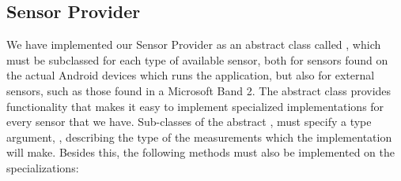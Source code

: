 \subsection{Sensor Provider}
\label{sub:providing_sensor_data_implementation}
We have implemented our Sensor Provider as an abstract class called , which must be subclassed for each type of available sensor, both for sensors found on the actual Android devices which runs the application, but also for external sensors, such as those found in a Microsoft Band 2. The abstract class provides functionality that makes it easy to implement specialized implementations for every sensor that we have. Sub-classes of the abstract , must specify a type argument, , describing the type of the measurements which the implementation will make. Besides this, the following methods must also be implemented on the specializations:


